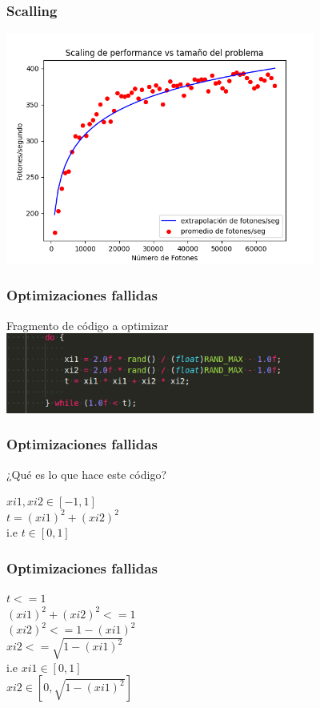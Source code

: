 \documentclass{beamer}
\begin{document}
\begin{frame}
    \frametitle{Scalling}
    \includegraphics[width=4in]{imagenes/scaling.png}    
\end{frame}


\begin{frame}
    \frametitle{Optimizaciones fallidas}

    Fragmento de código a optimizar \\
    \includegraphics[width=4in]{./imagenes/dowhile_optimizar.png}

\end{frame}

\begin{frame}
    \frametitle{Optimizaciones fallidas}
    ¿Qué es lo que hace este código? \\ \pause
    \begin{center}
        $xi1, xi2  \in [-1, 1] $ \\ \pause
        $t = (xi1)^2 + (xi2)^2$ \\ \pause
        i.e $ t \in [0,1]$
    
    \end{center}

\end{frame}


\begin{frame}
    \frametitle{Optimizaciones fallidas}
    \begin{center}
        $ t <= 1 $ \\\pause
        $(xi1)^2 + (xi2)^2 <= 1$ \\\pause
        $(xi2)^2 <= 1 - (xi1)^2$ \\\pause
        $xi2 <= \sqrt{1 - (xi1)^2}$\\\pause
        i.e $xi1 \in [0, 1]$\\
        $xi2 \in [0, \sqrt{1 - (xi1)^2}]$    

    \end{center}

\end{frame}
\end{document}
